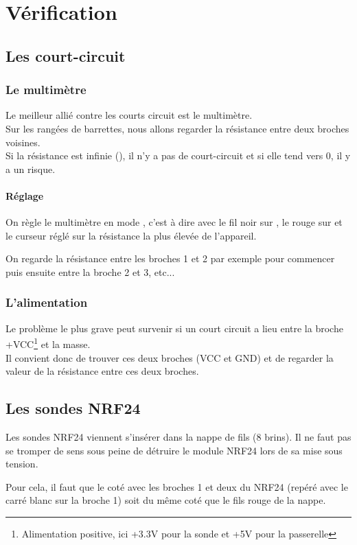 \chapter{Vérification}

\section{Les court-circuit}

\subsection{Le multimètre} 

Le meilleur allié contre les courts circuit est le multimètre.\\
Sur les rangées de barrettes, nous allons regarder la résistance entre deux broches voisines. \\
Si la résistance est infinie (), il n'y a pas de court-circuit et si elle tend vers 0, il y a un risque.

\subsubsection{Réglage}

On règle le multimètre en mode , c'est à dire avec le fil noir sur , le rouge sur \bold{$\Omega$} et le curseur réglé sur la résistance la plus élevée de l'appareil.


On regarde la résistance entre les broches 1 et 2 par exemple pour commencer puis ensuite entre la broche 2 et 3, etc...



\subsection{L'alimentation} 

Le problème le plus grave peut survenir si un court circuit a lieu entre la broche +VCC\footnote{Alimentation positive, ici +3.3V pour la sonde et +5V pour la passerelle}
et la masse.\\
Il convient donc de trouver ces deux broches (VCC et GND) et de regarder la valeur de la résistance entre ces deux broches.


\section{Les sondes NRF24}

Les sondes NRF24 viennent s'insérer dans la nappe de fils (8 brins). Il ne faut pas se tromper de sens sous peine de détruire le module NRF24 lors de sa mise sous tension.

Pour cela, il faut que le coté avec les broches 1 et deux du NRF24 (repéré avec le carré blanc sur la broche 1) soit du même coté que le fils rouge de la nappe.

